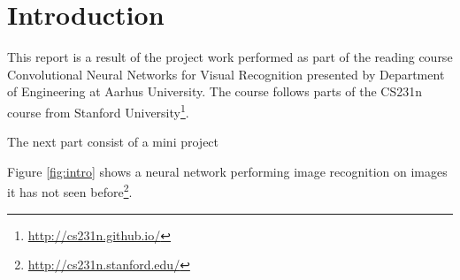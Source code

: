 \chapter{Introduction}
\label{chp:intro}
This report is a result of the project work performed as part of the reading course Convolutional Neural Networks for Visual Recognition presented by Department of Engineering at Aarhus University. The course follows parts of the CS231n course from Stanford University\footnote{\url{http://cs231n.github.io/}}.

The next part consist of a mini project 


Figure \ref{fig:intro} shows a neural network performing image recognition on images it has not seen before\footnote{\url{http://cs231n.stanford.edu/}}.

